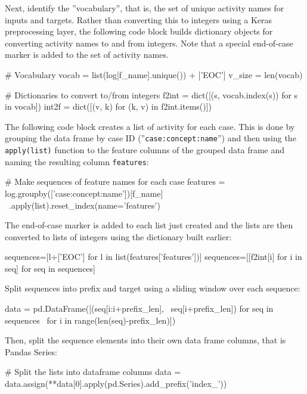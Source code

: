 \begin{withcode}
Next, identify the ''vocabulary'', that is, the set of unique activity names for inputs and targets. Rather than converting this to integers using a Keras preprocessing layer, the following code block builds dictionary objects for converting activity names to and from integers. Note that a special end-of-case marker is added to the set of activity names.

\begin{pythoncode}
# Vocabulary
vocab = list(log[f_name].unique()) + ['EOC']
v_size = len(vocab)

# Dictionaries to convert to/from integers
f2int = dict([(s, vocab.index(s)) for s in vocab])
int2f = dict([(v, k) for (k, v) in f2int.items()])
\end{pythoncode}

The following code block creates a list of activity for each case. This is done by grouping the data frame by case ID (''\texttt{case:concept:name}'') and then using the \texttt{apply(list)} function to the feature columns of the grouped data frame and naming the resulting column \texttt{features}:

\begin{pythoncode}
# Make sequences of feature names for each case
features = log.groupby(['case:concept:name'])[f_name] \
    .apply(list).reset_index(name='features')
\end{pythoncode}

The end-of-case marker is added to each list just created and the lists are then converted to lists of integers using the dictionary built earlier:

\begin{pythoncode}
sequences=[l+['EOC'] for l in list(features['features'])]
sequences=[[f2int[i] for i in seq] for seq in sequences]
\end{pythoncode}

Split sequences into prefix and target using a sliding window over each sequence:
\begin{pythoncode}
data = pd.DataFrame([(seq[i:i+prefix_len], \
    seq[i+prefix_len]) for seq in sequences \
    for i in range(len(seq)-prefix_len)])
\end{pythoncode}

Then, split the sequence elements into their own data frame columns, that is Pandas Series:

\begin{pythoncode}
# Split the lists into dataframe columns
data = data.assign(**data[0].apply(pd.Series).add_prefix('index_'))
\end{pythoncode}


\end{withcode}
